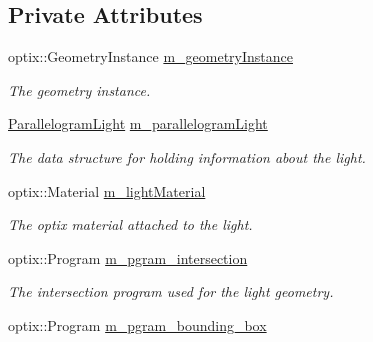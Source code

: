 \subsection*{Private Attributes}
\begin{DoxyCompactItemize}
\item 
\hypertarget{class_light_a1a38877bc851fc52aa56b74797cd4b39}{optix\-::\-Geometry\-Instance \hyperlink{class_light_a1a38877bc851fc52aa56b74797cd4b39}{m\-\_\-geometry\-Instance}}\label{class_light_a1a38877bc851fc52aa56b74797cd4b39}

\begin{DoxyCompactList}\small\item\em The geometry instance. \end{DoxyCompactList}\item 
\hypertarget{class_light_ae9a20c4be482422ffbfdbd20cbdced3b}{\hyperlink{struct_light_1_1_parallelogram_light}{Parallelogram\-Light} \hyperlink{class_light_ae9a20c4be482422ffbfdbd20cbdced3b}{m\-\_\-parallelogram\-Light}}\label{class_light_ae9a20c4be482422ffbfdbd20cbdced3b}

\begin{DoxyCompactList}\small\item\em The data structure for holding information about the light. \end{DoxyCompactList}\item 
\hypertarget{class_light_a717ad0883b7b5d662411ff8e07adc672}{optix\-::\-Material \hyperlink{class_light_a717ad0883b7b5d662411ff8e07adc672}{m\-\_\-light\-Material}}\label{class_light_a717ad0883b7b5d662411ff8e07adc672}

\begin{DoxyCompactList}\small\item\em The optix material attached to the light. \end{DoxyCompactList}\item 
\hypertarget{class_light_af3b4e7b6a3666c514b3d096529cf1f11}{optix\-::\-Program \hyperlink{class_light_af3b4e7b6a3666c514b3d096529cf1f11}{m\-\_\-pgram\-\_\-intersection}}\label{class_light_af3b4e7b6a3666c514b3d096529cf1f11}

\begin{DoxyCompactList}\small\item\em The intersection program used for the light geometry. \end{DoxyCompactList}\item 
\hypertarget{class_light_ab024a48ce987f83ea350b9ea5312a13a}{optix\-::\-Program \hyperlink{class_light_ab024a48ce987f83ea350b9ea5312a13a}{m\-\_\-pgram\-\_\-bounding\-\_\-box}}\label{class_light_ab024a48ce987f83ea350b9ea5312a13a}


\end{DoxyCompactItemize}

